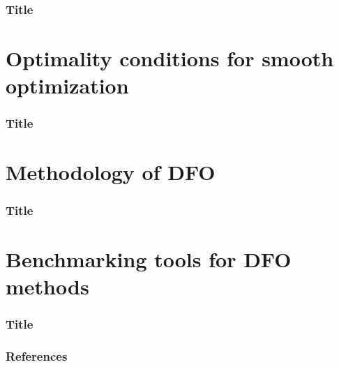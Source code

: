 \documentclass{polyu-presentation}
\begin{document}
\begin{frame}
    \frametitle{Title}
\end{frame}

\section{Optimality conditions for smooth optimization}

\begin{frame}
    \frametitle{Title}
\end{frame}

\section{Methodology of DFO}

\begin{frame}
    \frametitle{Title}
\end{frame}

\section{Benchmarking tools for DFO methods}

\begin{frame}
    \frametitle{Title}

    \parencite{Dolan_More_2002,More_Wild_2009,Gould_Scott_2016}
\end{frame}

\appendix

\begin{frame}[t,allowframebreaks]
    \frametitle{References}

	\printbibliography
\end{frame}
\end{document}

